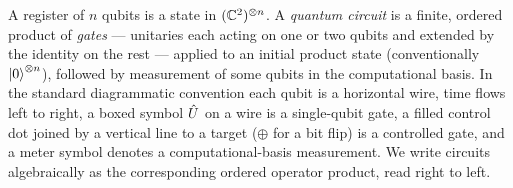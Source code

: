 \begin{definition}
\label{def:circuit-model}
A register of $n$ qubits is a state in
$(\mathbb{C}^2)^{\otimes n}$. A \emph{quantum circuit} is a finite, ordered
product of \emph{gates} --- unitaries each acting on one or two qubits
and extended by the identity on the rest --- applied to an initial
product state (conventionally $\ket{0}^{\otimes n}$), followed by
measurement of some qubits in the computational basis. In the standard
diagrammatic convention each qubit is a horizontal wire, time flows
left to right, a boxed symbol $\hat{U}$ on a wire is a single-qubit gate,
a filled control dot joined by a vertical line to a target
($\oplus$ for a bit flip) is a controlled gate, and a meter symbol
denotes a computational-basis measurement. We write circuits
algebraically as the corresponding ordered operator product, read
right to left.
\end{definition}

